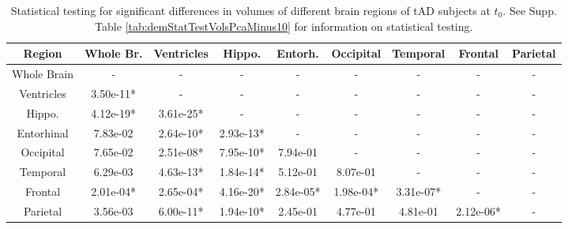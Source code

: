 \begin{table}
\centering
\begin{tabular}{c |c c c c c c c c }
Region & Whole Br. & Ventricles & Hippo. & Entorh. & Occipital & Temporal & Frontal & Parietal\\
\hline 
Whole Brain & - & - & - & - & - & - & - & -\\
Ventricles & 3.50e-11* & - & - & - & - & - & - & -\\
Hippo. & 4.12e-19* & 3.61e-25* & - & - & - & - & - & -\\
Entorhinal & 7.83e-02 & 2.64e-10* & 2.93e-13* & - & - & - & - & -\\
Occipital & 7.65e-02 & 2.51e-08* & 7.95e-10* & 7.94e-01 & - & - & - & -\\
Temporal & 6.29e-03 & 4.63e-13* & 1.84e-14* & 5.12e-01 & 8.07e-01 & - & - & -\\
Frontal & 2.01e-04* & 2.65e-04* & 4.16e-20* & 2.84e-05* & 1.98e-04* & 3.31e-07* & - & -\\
Parietal & 3.56e-03 & 6.00e-11* & 1.94e-10* & 2.45e-01 & 4.77e-01 & 4.81e-01 & 2.12e-06* & -\\
\end{tabular} 
\caption[Statistical testing for significant differences in volumes of different brain regions of tAD subjects at $t_0$.]{Statistical testing for significant differences in volumes of different brain regions of tAD subjects at $t_0$. See Supp. Table \ref{tab:demStatTestVolsPcaMinus10} for information on statistical testing.} 
\label{tab:demStatTestVolsAd0}
\end{table}



